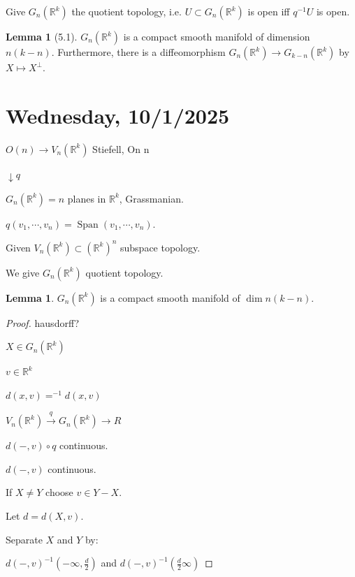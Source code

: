 \documentclass{article}
\theoremstyle{definition}
\newtheorem{lemma}[theorem]{Lemma}
\begin{document}
    Give \(G_n(\mathbb{R}^k)\) the quotient topology, i.e. \(U \subset G_n(\mathbb{R}^k)\) is open iff \(q ^{-1} U\) is open.

    \begin{lemma}
        [5.1] \(G_n(\mathbb{R}^k)\) is a compact smooth manifold of dimension \(n(k-n)\). Furthermore, there is a diffeomorphism \(G_n(\mathbb{R}^k) \to G_{k-n}(\mathbb{R}^k)\) by \(X \mapsto X^{\perp}\). 
    \end{lemma}

    \section*{Wednesday, 10/1/2025}
    
    \(O(n)\to V_n(\mathbb{R}^k)\) Stiefell, On n

    \(\downarrow q\)
    
    \(G_n(\mathbb{R}^k) = n\) planes in \(\mathbb{R}^k\), Grassmanian.

    \(q(v_1, \cdots , v_n) = \operatorname{Span}(v_1, \cdots , v_n)\).
    
    Given \(V_n(\mathbb{R}^k) \subset (\mathbb{R}^k)^n\) subspace topology.

    We give \(G_n(\mathbb{R}^k)\) quotient topology.

    \begin{lemma}
        \(G_n(\mathbb{R}^k)\) is a compact smooth manifold of \(\dim n(k-n)\).
    \end{lemma}

    \begin{proof}
        hausdorff?

        \(X\in G_n(\mathbb{R} ^k)\) 

        \(v\in \mathbb{R}^{k} \) 

        \(d(x,v) = ^{-1} d(x,v)\) 
        
        \(V_n(\mathbb{R}^k) \xrightarrow{q} G_n(\mathbb{R}^k) \xrightarrow{} R\) 

        \(d(-,v) \circ q\) continuous.

        \(d(-,v)\) continuous.
        
        If \(X\neq Y\) choose \(v\in Y - X\).
        
        Let \(d = d(X,v)\).

        Separate \(X\) and \(Y\) by:

        \(d(-,v)^{-1} (-\infty , \frac{d}{2})\) and \(d(-,v)^{-1} (\frac{d}{2} \infty )\)  
    \end{proof}
\end{document}
